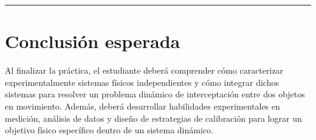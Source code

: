 \rule{\textwidth}{1pt}

\section*{Conclusión esperada}

Al finalizar la práctica, el estudiante deberá comprender cómo caracterizar experimentalmente sistemas físicos independientes y cómo integrar dichos sistemas para resolver un problema dinámico de interceptación entre dos objetos en movimiento. Además, deberá desarrollar habilidades experimentales en medición, análisis de datos y diseño de estrategias de calibración para lograr un objetivo físico específico dentro de un sistema dinámico.